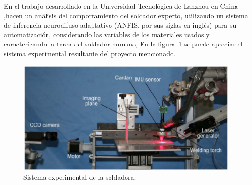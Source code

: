 
En el trabajo desarrollado en la Universidad Tecnol\'ogica de Lanzhou en
 China \cite{Zhang2017},hacen un an\'alisis del comportamiento del soldador 
 experto, utilizando un sistema de inferencia neurodifuso adaptativo (ANFIS,
 por sus siglas en ingl\'es) para su automatizaci\'on, considerando las
 variables de los materiales usados y caracterizando la tarea del soldador 
 humano, En la figura~\ref{fig:syswelding} se puede apreciar el sistema 
 experimental resultante del proyecto mencionado.


\begin{figure}[h]
\centering
\includegraphics[width=0.8\columnwidth]{chap2/Imagenes/Welding.eps}
\caption{Sistema experimental de la soldadora\cite{Zhang2017}.}
\label{fig:syswelding}
\end{figure} 
 